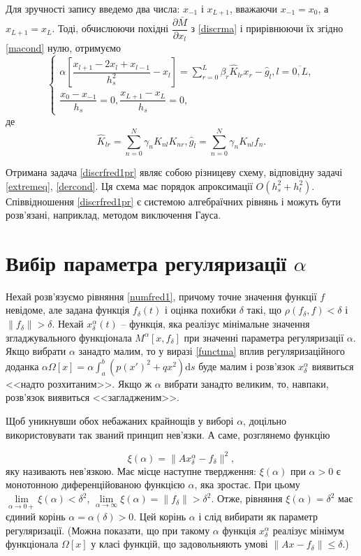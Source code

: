 \documentclass[14pt,twoside]{extreport}
\theoremstyle{mystyle}
\numberwithin{equation}{chapter}
\begin{document}
Для зручності запису введемо два числа: $x_{-1}$ і $x_{L+1}$, вважаючи $x_{-1}=x_0$, а $x_{L+1} = x_L$. Тоді, обчислюючи похідні $\dfrac{\partial \bar{M}}{\partial x_l}$ з \eqref{discrma} і прирівнюючи їх згідно \eqref{macond} нулю, отримуємо 
\begin{equation}\label{discrfred1pr}
 \left\{
\begin{array}{l}
 \alpha\left[\dfrac{x_{l+1} - 2 x_l + x_{l-1}}{h_s^2} - x_l\right] = \sum\limits_{r=0}^{L} \beta_r \hat{K}_{lr} x_r - \hat{g}_l, l=\overline{0, L},\\
 \dfrac{x_0-x_{-1}}{h_s} = 0, \dfrac{x_{L+1} - x_L}{h_s} = 0,
\end{array}
\right.
\end{equation}
де
\[
 \hat{K}_{lr} = \sum\limits_{n=0}^{N} \gamma_n K_{nl}K_{nr}, \hat{g}_l = \sum\limits_{n=0}^{N} \gamma_nK_{nl}f_n.
\]

Отримана задача \eqref{discrfred1pr} являє собою різницеву схему, відповідну задачі \eqref{extremeq}, \eqref{dercond}. Ця схема має порядок апроксимації $O(h_s^2 + h_t^2)$. Співвідношення \eqref{discrfred1pr} є системою алгебраїчних рівнянь і можуть бути розв'язані, наприклад, методом виключення Гауса.

\section{Вибір параметра регуляризації \texorpdfstring{$\alpha$}{alpha}}

Нехай розв'язуємо рівняння \eqref{numfred1}, причому точне значення функції $f$ невідоме, але задана функція $f_\delta (t)$ і оцінка похибки $\delta$ такі, що $\rho(f_\delta, f) < \delta$ і $\|f_\delta\| > \delta$. Нехай $x_\delta^\alpha (t)$ -- функція, яка реалізує мінімальне значення згладжувального функціонала $M^{\alpha} [x, f_\delta]$ при значенні параметра регуляризації $\alpha$. Якщо вибрати $\alpha$ занадто малим, то у виразі \eqref{functma} вплив регуляризаційного доданка $\alpha \Omega[x] = \alpha \int_{a}^{b} (p(x')^2 + qx^2)\mathrm{d}s$ буде малим і розв'язок $x_\delta^\alpha$ виявиться <<надто розхитаним>>. Якщо ж $\alpha$ вибрати занадто великим, то, навпаки, розв'язок виявиться <<загладженим>>.

Щоб уникнувши обох небажаних крайнощів у виборі $\alpha$, доцільно використовувати так званий принцип нев'язки. А саме, розглянемо функцію

\begin{equation}\label{discrepancy}
 \xi(\alpha) = \|Ax_\delta^\alpha - f_\delta\|^2,
\end{equation}
яку називають нев'язкою. Має місце наступне твердження: $\xi(\alpha)$ при $\alpha > 0$ є монотонною диференційованою функцією $\alpha$, яка зростає. При цьому $\lim\limits_{\alpha \to 0+} \xi(\alpha) < \delta^2$, $\lim\limits_{\alpha \to \infty} \xi(\alpha) = \|f_\delta\| > \delta^2$. Отже, рівняння $\xi(\alpha) = \delta^2$ має єдиний корінь $\alpha = \alpha(\delta) > 0$. Цей корінь $\alpha$ і слід вибирати як параметр регуляризації. (Можна показати, що при такому $\alpha$ функція $x_\delta^\alpha$ реалізує мінімум функціонала $\Omega[x]$ у класі функцій, що задовольняють умові $\|Ax - f_\delta\| \leqslant \delta$.)
\end{document}
